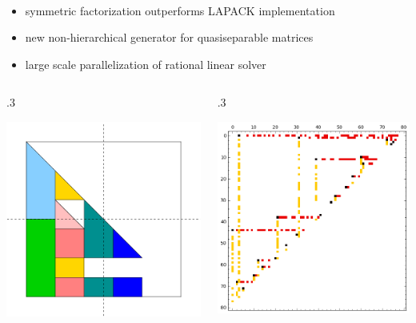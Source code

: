 \documentclass{beamer}
\begin{document}
\begin{frame}
    \begin{description}
    \item<2-> [Leading edge achievements in linear algebra] \
      {\small
      \begin{itemize}
      \item symmetric factorization outperforms LAPACK implementation
      \item new non-hierarchical generator for quasiseparable matrices
      \item large scale parallelization of rational linear solver
      \end{itemize}
      }
    \begin{columns}
      \begin{column} {.3\textwidth}
        \begin{center}
          \includegraphics[width=.6\textwidth]{ARrec11}
      \end{center}
      \end{column}
      \begin{column} {.3\textwidth}
        \begin{center}
          \includegraphics[width=.6\textwidth]{Bruhat}

\end{center}
\end{column}
\end{columns}
\end{description}
\end{frame}
\end{document}
